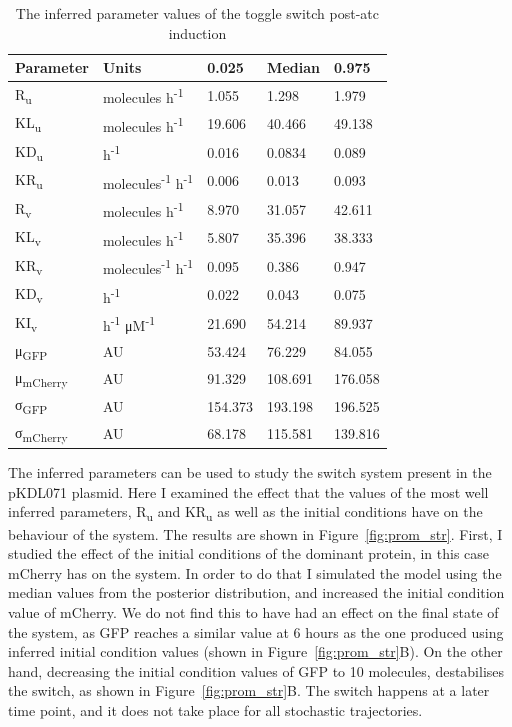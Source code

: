 \begin{table}[htb]
\centering
\caption{The inferred parameter values of the toggle switch post-\acrshort{atc} induction}
\label{tab:inf_params_atc}
\begin{tabular}{@{}lllll@{}}
\toprule
Parameter & Units &0.025 & Median & 0.975 \\ \midrule
R\textsubscript{u} & molecules h\textsuperscript{-1}& 1.055 & 1.298 & 1.979 \\
KL\textsubscript{u} &molecules h\textsuperscript{-1}& 19.606 & 40.466 & 49.138 \\
KD\textsubscript{u} &h\textsuperscript{-1}& 0.016 & 0.0834 & 0.089 \\
KR\textsubscript{u} &molecules\textsuperscript{-1} h\textsuperscript{-1}& 0.006 & 0.013 & 0.093 \\
R\textsubscript{v} & molecules h\textsuperscript{-1}& 8.970 & 31.057 & 42.611 \\
KL\textsubscript{v} &molecules h\textsuperscript{-1}& 5.807 & 35.396 & 38.333 \\
KR\textsubscript{v} &molecules\textsuperscript{-1} h\textsuperscript{-1}& 0.095 & 0.386 & 0.947 \\
KD\textsubscript{v} &h\textsuperscript{-1}& 0.022 & 0.043 & 0.075 \\
KI\textsubscript{v} &h\textsuperscript{-1} μM\textsuperscript{-1}& 21.690 & 54.214 & 89.937 \\
μ\textsubscript{GFP} &AU& 53.424 & 76.229 & 84.055 \\
μ\textsubscript{mCherry} &AU& 91.329 & 108.691 & 176.058 \\
σ\textsubscript{GFP} &AU& 154.373 & 193.198 & 196.525 \\
σ\textsubscript{mCherry} &AU& 68.178 & 115.581 & 139.816 \\ \bottomrule
\end{tabular}
\end{table}

The inferred parameters can be used to study the switch system present in the pKDL071 plasmid. Here I examined the effect that the values of the most well inferred parameters, R\textsubscript{u} and KR\textsubscript{u} as well as the initial conditions have on the behaviour of the system. The results are shown in Figure~\ref{fig:prom_str}. First, I studied the effect of the initial conditions of the dominant protein, in this case mCherry has on the system. In order to do that I simulated the model using the median values from the posterior distribution, and increased the initial condition value of mCherry. We do not find this to have had an effect on the final state of the system, as GFP reaches a similar value at 6 hours as the one produced using inferred initial condition values (shown in Figure~\ref{fig:prom_str}B). On the other hand, decreasing the initial condition values of GFP to 10 molecules, destabilises the switch, as shown in Figure~\ref{fig:prom_str}B. The switch happens at a later time point, and it does not take place for all stochastic trajectories.   

